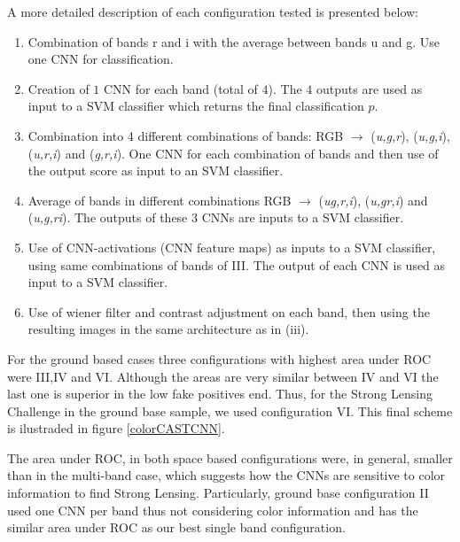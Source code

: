 \documentclass[useAMS,usenatbib]{mnras}
\begin{document}
A more detailed description of each configuration tested is presented below:
\begin{enumerate}
\item Combination of bands r and i with the average between bands u and g. Use one CNN for classification.
\item Creation of $1$ CNN for each band (total of $4$). The $4$ outputs are used as input to a SVM classifier which returns the final classification $p$. 
\item Combination into 4 different combinations of bands:  RGB $\rightarrow$ (\textit{u,g,r}), (\textit{u,g,i}), (\textit{u,r,i}) and (\textit{g,r,i}). One CNN for each combination of bands and then use of the output score as input to an SVM classifier.
%
\item  Average of bands in different combinations RGB $\rightarrow$ (\textit{ug,r,i}), (\textit{u,gr,i}) and (\textit{u,g,ri}). The outputs of these 3 CNNs are inputs to a SVM classifier.
\item Use of CNN-activations (CNN feature maps) as inputs to a SVM classifier, using same combinations of bands of III. The output of each CNN is used as input to a SVM classifier.
\item Use of wiener filter and contrast adjustment on each band, then using the resulting images in the same architecture as in (iii). 
\end{enumerate}

For the ground based cases three configurations with highest area under ROC were III,IV and VI. Although the areas are very similar between IV and VI the last one is superior in the low fake positives end. Thus, for the Strong Lensing Challenge in the ground base sample, we used configuration VI. This final scheme is ilustraded in figure \ref{colorCASTCNN}.

The area under ROC, in both space based configurations were, in general, smaller than in the multi-band case, which suggests how the CNNs are sensitive to color information to find Strong Lensing. Particularly,  ground base configuration II used one CNN per band thus not considering color information and has the similar area under ROC as our best single band configuration. 

\end{document}
